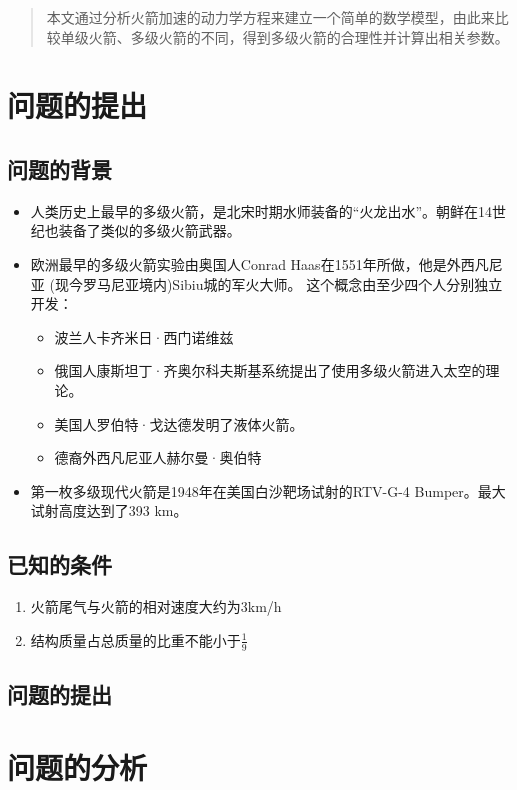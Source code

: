 \documentclass{JXUSTmodeling}
\begin{document}
\begin{abstract}
    本文通过分析火箭加速的动力学方程来建立一个简单的数学模型，由此来比较单级火箭、多级火箭的不同，得到多级火箭的合理性并计算出相关参数。
\end{abstract}
\section{问题的提出}\label{sec:1}
\subsection{问题的背景}\label{sub:1.1}
\begin{itemize}
    \item 人类历史上最早的多级火箭，是北宋时期水师装备的“火龙出水”。朝鲜在14世纪也装备了类似的多级火箭武器。
    \item 欧洲最早的多级火箭实验由奥国人Conrad Haas在1551年所做，他是外西凡尼亚 (现今罗马尼亚境内)Sibiu城的军火大师。 这个概念由至少四个人分别独立开发：
      \begin{itemize}
        \item 波兰人卡齐米日·西门诺维兹
        \item 俄国人康斯坦丁·齐奥尔科夫斯基系统提出了使用多级火箭进入太空的理论。
        \item 美国人罗伯特·戈达德发明了液体火箭。
        \item 德裔外西凡尼亚人赫尔曼·奥伯特
      \end{itemize}
      \item 第一枚多级现代火箭是1948年在美国白沙靶场试射的RTV-G-4 Bumper。最大试射高度达到了393 km。
  \end{itemize}
  
  
  
\subsection{已知的条件}\label{sub:1.2}
\begin{enumerate}
\item 火箭尾气与火箭的相对速度大约为3km/h
\item 结构质量占总质量的比重不能小于$\frac{1}{9}$\label{tab:bibi}
\end{enumerate}
\subsection{问题的提出}\label{sub:1.3}

\section{问题的分析}\label{sec:2}
\end{document}
